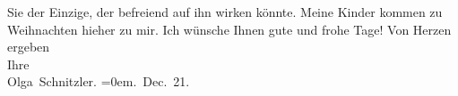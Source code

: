 \begin{ledgroupsized}[t]{13cm}
               Sie der Einzige, der befreiend auf ihn wirken könnte.\pend
           \pstart
           Meine Kinder kommen
               zu Weihnachten hieher zu mir.\pend
           \pstart
           {\pb}Ich wünsche Ihnen gute
               und frohe Tage! \pend
           \pstart
           Von Herzen ergeben{\\[\baselineskip]}Ihre{\\[\baselineskip]}\spacefill\mbox{Olga Schnitzler.}\pend
           \leftskip=0em{}. Dec. 21.\pend
           
         
         \endnumbering{}\end{ledgroupsized}  \newcommand{\dateiname}{L02371}\newcommand{\titel}{Olga Schnitzler an Hermann Bahr, 16. 12. 1921}\newcommand{\editorInnen}{ Kurt Ifkovits,  Martin Anton Müller}
      